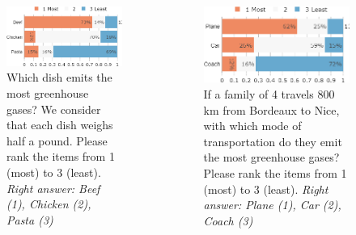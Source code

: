 \begin{framefont}{\small}
\begin{frame}{}%
\begin{columns}
\begin{column}{0.5\textwidth}
\begin{figure}
\caption{Which dish emits the most greenhouse gases? We consider that each dish weighs half a pound.
Please rank the items from 1 (most) to 3 (least).
\newline \footnotesize{\textit{Right answer: Beef (1), Chicken (2), Pasta (3)}}}
\includegraphics[width=.43\paperwidth]{../figures/FR/footprint_food_FR.png}
\end{figure}
\end{column}
\begin{column}{0.5\textwidth}
\begin{figure}
\caption{If a family of 4 travels 800 km from Bordeaux to Nice, with which mode of transportation do they emit the most greenhouse gases? %
Please rank the items from 1 (most) to 3 (least).
\newline \footnotesize{\textit{Right answer: Plane (1), Car (2), Coach (3)}}}
\includegraphics[width=.43\paperwidth]{../figures/FR/footprint_transport_FR.png}
\end{figure}
\end{column}
\end{columns}
\end{frame}


\end{framefont}
